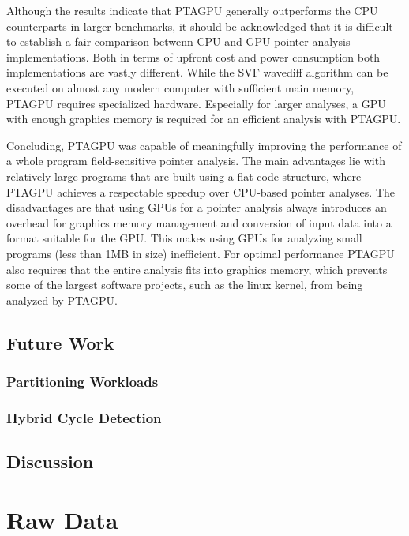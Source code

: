 Although the results indicate that PTAGPU generally outperforms the CPU counterparts in larger benchmarks, it should be acknowledged that it is difficult to establish a fair comparison betwenn CPU and GPU pointer analysis implementations.
Both in terms of upfront cost and power consumption both implementations are vastly different. While the SVF wavediff algorithm can be executed on almost any modern computer with sufficient main memory, PTAGPU requires specialized hardware. Especially for larger analyses, a GPU with enough graphics memory is required for an efficient analysis with PTAGPU.

Concluding, PTAGPU was capable of meaningfully improving the performance of a whole program field-sensitive pointer analysis.
The main advantages lie with relatively large programs that are built using a flat code structure, where PTAGPU achieves a respectable speedup over CPU-based pointer analyses.
The disadvantages are that using GPUs for a pointer analysis always introduces an overhead for graphics memory management and conversion of input data into a format suitable for the GPU.
This makes using GPUs for analyzing small programs (less than 1MB in size) inefficient.
For optimal performance PTAGPU also requires that the entire analysis fits into graphics memory, which prevents some of the largest software projects, such as the linux kernel, from being analyzed by PTAGPU.

\section{Future Work}
\subsection{Partitioning Workloads}
\subsection{Hybrid Cycle Detection}
\section{Discussion}

\appendix

\chapter{Raw Data}

